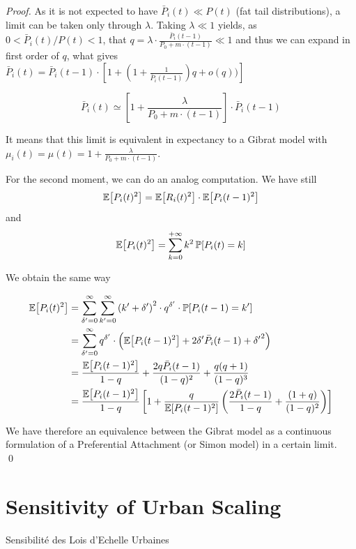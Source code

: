 \begin{proof}
As it is not expected to have $\bar{P}_i(t)\ll P(t)$ (fat tail distributions), a limit can be taken only through $\lambda$. Taking $\lambda \ll 1$ yields, as $0 < \bar{P}_i(t)/P(t) < 1$, that $q=\lambda\cdot\frac{\bar{P}_i(t-1)}{P_0 + m\cdot (t-1)} \ll 1$ and thus we can expand in first order of $q$, what gives $\bar{P}_i(t)=\bar{P}_i(t-1)\cdot \left[1 + \left(1+\frac{1}{\bar{P}_i(t-1)}\right)q + o(q))\right]$

\[
\bar{P}_i(t) \simeq \left[1 + \frac{\lambda}{P_0 + m\cdot (t-1)}\right]\cdot \bar{P}_i(t-1)
\]

It means that this limit is equivalent in expectancy to a Gibrat model with $\mu_i(t) = \mu(t)=1 + \frac{\lambda}{P_0 + m\cdot (t-1)}$.

For the second moment, we can do an analog computation. We have still \[\operatorname{\mathbb{E}}\!\left[P_i(t)^2\right] = \operatorname{\mathbb{E}}\!\left[R_i(t)^2\right]\cdot \operatorname{\mathbb{E}}\!\left[P_i(t-1)^2\right]\]
and
\[\operatorname{\mathbb{E}}\!\left[P_i(t)^2\right]=\sum_{k=0}^{+\infty}{k^2 \operatorname{\mathbb{P}}\!\left[P_i(t)=k\right]}\] 

We obtain the same way 

\[
\begin{split}
\operatorname{\mathbb{E}}\!\left[P_i(t)^2\right] & = \sum_{\delta^{\prime}=0}^{\infty}{\sum_{k^{\prime}=0}^{\infty}{\left(k^\prime + \delta^{\prime}\right)^2\cdot q^{\delta^{\prime}} \cdot \operatorname{\mathbb{P}}\!\left[P_i(t-1)=k^\prime\right]}}\\ 
& = \sum_{\delta^{\prime}=0}^{\infty}{q^{\delta^{\prime}}\cdot \left(\operatorname{\mathbb{E}}\!\left[P_i(t-1)^2\right]+2\delta^{\prime}\bar{P}_i(t-1) + {\delta^{\prime}}^2\right)}\\
& = \frac{\operatorname{\mathbb{E}}\!\left[P_i(t-1)^2\right]}{1-q} + \frac{2 q \bar{P}_i(t-1)}{(1-q)^2} + \frac{q(q+1)}{(1-q)^3}\\
& = \frac{\operatorname{\mathbb{E}}\!\left[P_i(t-1)^2\right]}{1-q}\left[1 + \frac{q}{\operatorname{\mathbb{E}}\!\left[P_i(t-1)^2\right]}\left(\frac{2\bar{P}_i(t-1)}{1-q} + \frac{(1+q)}{(1-q)^2}\right)\right]
\end{split}
\]



We have therefore an equivalence between the Gibrat model as a continuous formulation of a Preferential Attachment (or Simon model) in a certain limit. \qed

\end{proof}











\section{Sensitivity of Urban Scaling}{Sensibilité des Lois d'Echelle Urbaines}

